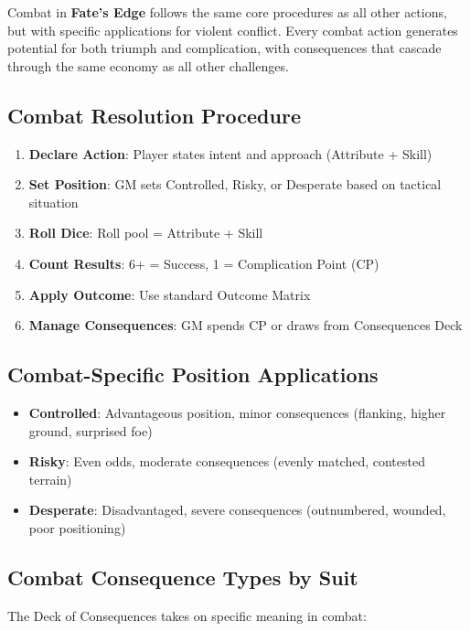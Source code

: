 Combat in \textbf{Fate's Edge} follows the same core procedures as all other actions, but with specific applications for violent conflict. Every combat action generates potential for both triumph and complication, with consequences that cascade through the same economy as all other challenges.

\subsection*{Combat Resolution Procedure}

\begin{enumerate}
    \item \textbf{Declare Action}: Player states intent and approach (Attribute + Skill)
    \item \textbf{Set Position}: GM sets Controlled, Risky, or Desperate based on tactical situation
    \item \textbf{Roll Dice}: Roll pool = Attribute + Skill
    \item \textbf{Count Results}: 6+ = Success, 1 = Complication Point (CP)
    \item \textbf{Apply Outcome}: Use standard Outcome Matrix
    \item \textbf{Manage Consequences}: GM spends CP or draws from Consequences Deck
\end{enumerate}

\subsection*{Combat-Specific Position Applications}

\begin{itemize}
    \item \textbf{Controlled}: Advantageous position, minor consequences (flanking, higher ground, surprised foe)
    \item \textbf{Risky}: Even odds, moderate consequences (evenly matched, contested terrain)
    \item \textbf{Desperate}: Disadvantaged, severe consequences (outnumbered, wounded, poor positioning)
\end{itemize}

\subsection*{Combat Consequence Types by Suit}

The Deck of Consequences takes on specific meaning in combat:

